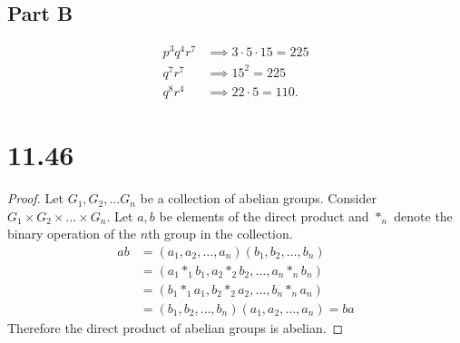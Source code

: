 \documentclass[12pt]{extarticle}
\begin{document}

\subsection*{Part B}
\begin{align*}
	p^3 q^4 r^7 &\implies 3 \cdot 5 \cdot 15 = 225 \\
	q^7 r^7 &\implies 15^2 = 225 \\
	q^8 r^4 &\implies 22 \cdot 5 = 110
.\end{align*}

\section*{11.46}
\begin{proof}
	Let $G_1, G_2, \ldots G_n$ be a collection of abelian groups. Consider $G_1 \times G_2 \times \ldots \times G_n$. Let $a,b$ be elements of the direct product and $*_n$ denote the binary operation of the $n$th group in the collection.
	\begin{align*}
		ab &= (a_1, a_2, \ldots, a_n)(b_1, b_2, \ldots, b_n) \\
		&= (a_1 *_1 b_1, a_2 *_2 b_2, \ldots, a_n *_n b_n) \\
		&= (b_1 *_1 a_1, b_2 *_2 a_2, \ldots, b_n *_n a_n) \\
		&= (b_1, b_2, \ldots, b_n)(a_1, a_2, \ldots, a_n) = ba
	\end{align*}
	Therefore the direct product of abelian groups is abelian.
\end{proof}
\end{document}
